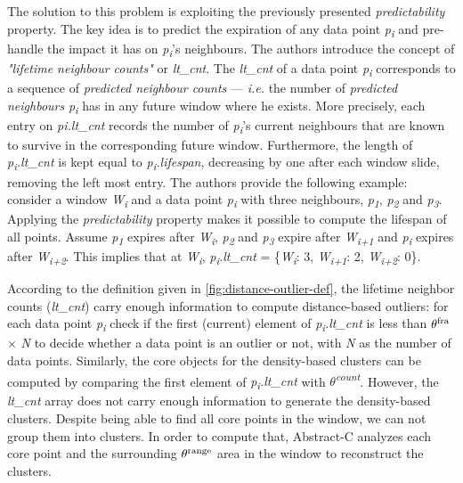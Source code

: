 The solution to this problem is exploiting the previously presented \textit{predictability} property. The key idea is to predict the expiration of any data point \textit{p\textsubscript{i}} and pre-handle the impact it has on \textit{p\textsubscript{i}}'s neighbours. The authors introduce the concept of \textit{"lifetime neighbour counts"} or \textit{lt\_cnt}. The \textit{lt\_cnt} of a data point \textit{p\textsubscript{i}} corresponds to a sequence of \textit{predicted neighbour counts} --- \textit{i.e.} the number of \textit{predicted neighbours} \textit{p\textsubscript{i}} has in any future window where he exists. More precisely, each entry on \textit{pi.lt\_cnt} records the number of \textit{p\textsubscript{i}}'s current neighbours that are known to survive in the corresponding future window. Furthermore, the length of \textit{p\textsubscript{i}.lt\_cnt} is kept equal to \textit{p\textsubscript{i}.lifespan}, decreasing by one after each window slide, removing the left most entry. The authors provide the following example: consider a window \textit{W\textsubscript{i}} and a data point \textit{p\textsubscript{i}} with three neighbours, \textit{p\textsubscript{1}}, \textit{p\textsubscript{2}} and \textit{p\textsubscript{3}}. Applying the \textit{predictability} property makes it possible to compute the lifespan of all points. Assume \textit{p\textsubscript{1}} expires after \textit{W\textsubscript{i}}, \textit{p\textsubscript{2}} and \textit{p\textsubscript{3}} expire after \textit{W\textsubscript{i+1}} and \textit{p\textsubscript{i}} expires after \textit{W\textsubscript{i+2}}. This implies that at \textit{W\textsubscript{i}}, \textit{p\textsubscript{i}.lt\_cnt} = \{\textit{W\textsubscript{i}}: 3, \textit{W\textsubscript{i+1}}: 2, \textit{W\textsubscript{i+2}}: 0\}. 

According to the definition given in \ref{fig:distance-outlier-def}, the lifetime neighbor counts (\textit{lt\_cnt}) carry enough information to compute distance-based outliers: for each data point \textit{p\textsubscript{i}} check if the first (current) element of \textit{p\textsubscript{i}.lt\_cnt} is less than  \textit{$\theta\textsuperscript{fra}$} $\times$ \textit{N} to decide whether a data point is an outlier or not, with \textit{N} as the number of data points. Similarly, the core objects for the density-based clusters can be computed by comparing the first element of \textit{p\textsubscript{i}.lt\_cnt} with \textit{$\theta$\textsuperscript{count}}. However, the \textit{lt\_cnt} array does not carry enough information to generate the density-based clusters. Despite being able  to find all core points in the window, we can not group them into clusters. In order to compute that, Abstract-C analyzes each core point and the surrounding $\theta\textsuperscript{range}$ area in the window to reconstruct the clusters.

